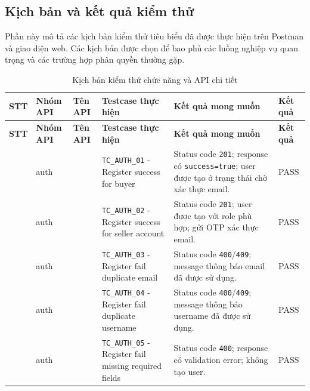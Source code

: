 \subsection{Kịch bản và kết quả kiểm thử}

Phần này mô tả các kịch bản kiểm thử tiêu biểu đã được thực hiện trên Postman và giao diện web. Các kịch bản được chọn để bao phủ các luồng nghiệp vụ quan trọng và các trường hợp phân quyền thường gặp.

\newcommand{\apiendpoint}[1]{\begingroup\ttfamily\scriptsize\seqsplit{#1}\endgroup}
{\scriptsize
\setlength{\tabcolsep}{1.5pt}
\renewcommand{\arraystretch}{1.12}
\begin{longtable}{|>{\centering\arraybackslash}p{}|>{\raggedright\arraybackslash}p{}|>{\raggedright\arraybackslash}p{}|>{\raggedright\arraybackslash}p{}|>{\raggedright\arraybackslash}p{}|>{\centering\arraybackslash}p{}|}
\caption{Kịch bản kiểm thử chức năng và API chi tiết} \\
\hline
\textbf{STT} & \textbf{Nhóm API} & \textbf{Tên API} & \textbf{Testcase thực hiện} & \textbf{Kết quả mong muốn} & \textbf{Kết quả} \\ \hline
\endfirsthead
\hline
\textbf{STT} & \textbf{Nhóm API} & \textbf{Tên API} & \textbf{Testcase thực hiện} & \textbf{Kết quả mong muốn} & \textbf{Kết quả} \\ \hline
\endhead
1 & auth & \apiendpoint{POST /api/auth/register} & \texttt{TC\_AUTH\_01} - Register success for buyer & Status code \texttt{201}; response có \texttt{success=true}; user được tạo ở trạng thái chờ xác thực email. & PASS \\ \hline
2 & auth & \apiendpoint{POST /api/auth/register} & \texttt{TC\_AUTH\_02} - Register success for seller account & Status code \texttt{201}; user được tạo với role phù hợp; gửi OTP xác thực email. & PASS \\ \hline
3 & auth & \apiendpoint{POST /api/auth/register} & \texttt{TC\_AUTH\_03} - Register fail duplicate email & Status code \texttt{400}/\texttt{409}; message thông báo email đã được sử dụng. & PASS \\ \hline
4 & auth & \apiendpoint{POST /api/auth/register} & \texttt{TC\_AUTH\_04} - Register fail duplicate username & Status code \texttt{400}/\texttt{409}; message thông báo username đã được sử dụng. & PASS \\ \hline
5 & auth & \apiendpoint{POST /api/auth/register} & \texttt{TC\_AUTH\_05} - Register fail missing required fields & Status code \texttt{400}; response có validation error; không tạo user. & PASS \\ \hline

\end{longtable}}
